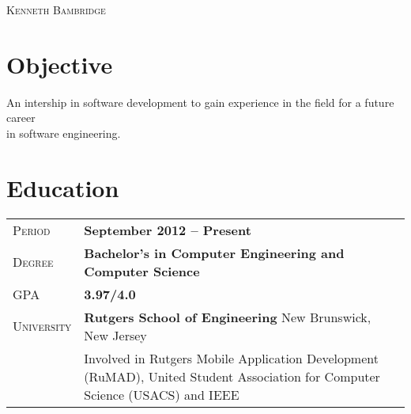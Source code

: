 \documentclass[a4paper, oneside, final]{scrartcl} %
\newcommand{\gray}{\rowcolor[gray]{.90}} %
\begin{document}
\begin{center} %


{\fontsize{30}{30}\selectfont\scshape Kenneth Bambridge} %

\vspace{0.8cm} %


\section{Objective}

An intership in software development to gain experience in the field for a future career \\ in software engineering.


\section{Education}

\begin{tabularx}{0.97\linewidth}{>{\raggedleft\scshape}p{2cm}X}
\gray Period & \textbf{September 2012 -- Present}\\
\gray Degree & \textbf{Bachelor's in Computer Engineering and Computer Science}\\
\gray GPA & \textbf{3.97/4.0}\\
\gray University & \textbf{Rutgers School of Engineering} \hfill New Brunswick, New Jersey\\
 & Involved in Rutgers Mobile Application Development (RuMAD), United Student Association for
Computer Science (USACS) and IEEE
\end{tabularx}

\vspace{12pt}


\end{center}
\end{document}
